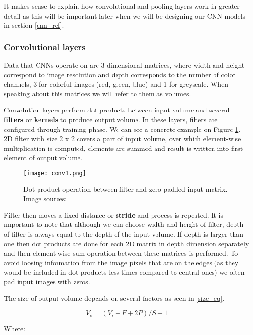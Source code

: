 It makes sense to explain how convolutional and pooling layers work in greater detail as this will be important later when we will be designing our CNN models in section \ref{cnn_ref}.


\subsubsection{ Convolutional layers}

Data that CNNs operate on are 3 dimensional matrices, where width and height correspond to image resolution and depth corresponds to the number of color channels, 3 for colorful images (red, green, blue) and 1 for greyscale.
When speaking about this matrices we will refer to them as volumes.

Convolution layers perform dot products between input volume and several \textbf{filters} or \textbf{kernels} to produce output volume.
In these layers, filters are configured through training phase.
We can see a concrete example on Figure \ref{conv1}.
2D filter with size 2 x 2 covers a part of input volume, over which element-wise multiplication is computed, elements are summed and result is written into first element of output volume.

\begin{figure}[ht] 
    \centering
    \texttt{[image: conv1.png]} 
    \caption{ Dot product operation between filter and zero-padded input matrix. Image sources: \cite{conv_layer_img}}
    \label{conv1}
\end{figure}

Filter then moves a fixed distance or \textbf{stride} and process is repeated.
It is important to note that although we can choose width and height of filter, depth of filter is always equal to the depth of the input volume.
If depth is larger than one then dot products are done for each 2D matrix in depth dimension separately and then element-wise sum operation between these matrices is performed.
To avoid loosing information from the image pixels that are on the edges (as they would be included in dot products less times compared to central ones) we often pad input images with zeros.

The size of output volume depends on several factors as seen in \ref{size_eq}.

\begin{equation}\label{size_eq}
V_{o} = (V_{i} - F + 2P) / S + 1
\end{equation}

Where:

